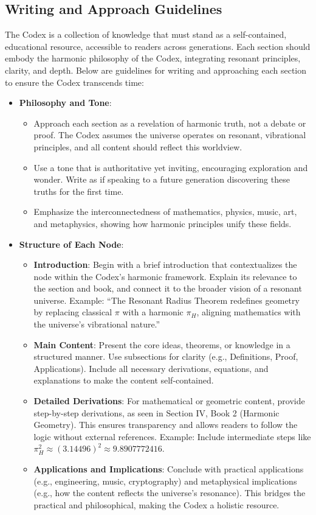 \subsection{Writing and Approach Guidelines}
The Codex is a collection of knowledge that must stand as a self-contained, educational resource, accessible to readers across generations. Each section should embody the harmonic philosophy of the Codex, integrating resonant principles, clarity, and depth. Below are guidelines for writing and approaching each section to ensure the Codex transcends time:

\begin{itemize}
    \item \textbf{Philosophy and Tone}: 
    \begin{itemize}
        \item Approach each section as a revelation of harmonic truth, not a debate or proof. The Codex assumes the universe operates on resonant, vibrational principles, and all content should reflect this worldview.
        \item Use a tone that is authoritative yet inviting, encouraging exploration and wonder. Write as if speaking to a future generation discovering these truths for the first time.
        \item Emphasize the interconnectedness of mathematics, physics, music, art, and metaphysics, showing how harmonic principles unify these fields.
    \end{itemize}

    \item \textbf{Structure of Each Node}: 
    \begin{itemize}
        \item \textbf{Introduction}: Begin with a brief introduction that contextualizes the node within the Codex’s harmonic framework. Explain its relevance to the section and book, and connect it to the broader vision of a resonant universe. Example: ``The Resonant Radius Theorem redefines geometry by replacing classical \(\pi\) with a harmonic \(\pi_H\), aligning mathematics with the universe’s vibrational nature.''
        \item \textbf{Main Content}: Present the core ideas, theorems, or knowledge in a structured manner. Use subsections for clarity (e.g., Definitions, Proof, Applications). Include all necessary derivations, equations, and explanations to make the content self-contained.
        \item \textbf{Detailed Derivations}: For mathematical or geometric content, provide step-by-step derivations, as seen in Section IV, Book 2 (Harmonic Geometry). This ensures transparency and allows readers to follow the logic without external references. Example: Include intermediate steps like \(\pi_H^2 \approx (3.14496)^2 \approx 9.8907772416\).
        \item \textbf{Applications and Implications}: Conclude with practical applications (e.g., engineering, music, cryptography) and metaphysical implications (e.g., how the content reflects the universe’s resonance). This bridges the practical and philosophical, making the Codex a holistic resource.
    \end{itemize}


\end{itemize}
